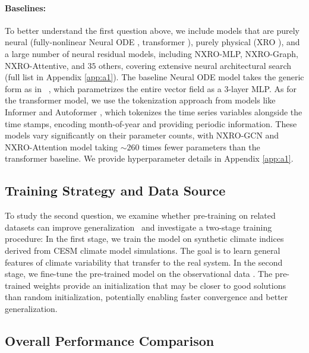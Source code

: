 \paragraph{Baselines:}To better understand the first question above, we include models that are purely neural (fully-nonlinear Neural ODE \cite{chen2018neuralode}, transformer \cite{vaswani2017attention}), purely physical (XRO \cite{zhao2024xro}), and a large number of neural residual models, including NXRO-MLP, NXRO-Graph, NXRO-Attentive, and $35$ others, covering extensive neural architectural search (full list in Appendix \ref{app:a1}). The baseline Neural ODE model takes the generic form as in ~\cite{chen2018neuralode}, which parametrizes the entire vector field  as a 3-layer MLP. As for the transformer model, we use the tokenization approach from models like Informer  \cite{zhou2021informerefficienttransformerlong} and Autoformer \cite{wu2022autoformerdecompositiontransformersautocorrelation}, which tokenizes the time series variables alongside the time stamps, encoding month-of-year and providing  periodic information. These models vary significantly on their parameter counts, with NXRO-GCN and NXRO-Attention model taking $\sim 260$ times fewer parameters than the transformer baseline. We provide  hyperparameter details in Appendix \ref{app:a1}.  


\subsection{Training Strategy and Data Source}
 
To study the second question, we examine whether pre-training on related datasets can improve generalization~\cite{pan2010transfer,weiss2016survey, pmlr-v202-nguyen23a, bodnar2025earthsystemfm} and investigate a two-stage training procedure: In the first stage, we train the model on synthetic climate indices derived from CESM  climate model simulations. The goal is to learn general features of climate variability that transfer to the real system. In the second stage, we fine-tune the pre-trained model on the observational data \cite{zuo2019oras5}. The pre-trained weights provide an initialization that may be closer to good solutions than random initialization, potentially enabling faster convergence and better generalization. 

\subsection{Overall Performance Comparison}

